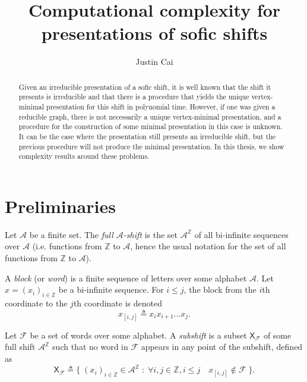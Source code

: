 \documentclass[hidelinks]{article}
\title{Computational complexity for presentations of sofic shifts}
\author{Justin Cai}
\newcommand{\Ac}{\mathcal{A}}  %
\newcommand{\Fc}{\mathcal{F}}
\newcommand{\shift}[1]{\mathsf{X}_{#1}}
\newcommand{\term}[1]{\textit{#1}}
\theoremstyle{definition}
\begin{document}
\maketitle

\begin{abstract}
    Given an irreducible presentation of a sofic shift, it is well known that the 
    shift it presents is irreducible and that there is a 
    procedure that yields the unique vertex-minimal presentation for
    this shift in polynomial time. However, if one was given a reducible 
    graph, there is not necessarily a unique vertex-minimal presentation, and 
    a procedure for the construction of some minimal presentation in 
    this case is unknown. It can be the case where the presentation still presents 
    an irreducible shift, but the previous procedure will not produce the 
    minimal presentation. In this thesis, we show complexity results around 
    these problems.
\end{abstract}


\section{Preliminaries}

\begin{definition}
    Let \(\Ac\) be a finite set. The \term{full \(\Ac\)-shift} is the set \(\Ac^\mathbb{Z}\) of all 
    bi-infinite sequences over \(\Ac\) (i.e. functions from \(\mathbb{Z}\) to \(\Ac\), hence the 
    usual notation for the set of all functions from \(\mathbb{Z}\) to \(\Ac\)).
\end{definition}

\noindent A \term{block} (or \term{word}) is a finite sequence of letters over some alphabet \(\Ac\). 
Let \(x=(x_i)_{i \in \mathbb{Z}}\) be a bi-infinite sequence. For \(i \leq j\), the block from the 
\(i\)th coordinate to the \(j\)th coordinate is denoted \[x_{[i,j]} \triangleq x_i x_{i+1} \dots x_{j}.\]

\begin{definition}
    Let \(\Fc\) be a set of words over some alphabet. A \term{subshift} is a subset \(\shift{\Fc}\)
    of some full shift \(\Ac^\mathbb{Z}\) such that no word in \(\Fc\) appears in any point of the subshift,
    defined as
    \[\shift{\Fc} \triangleq \Big\{ \; (x_i)_{i \in \mathbb{Z}} \in \Ac^\mathbb{Z} \; : \; \forall i, j \in \mathbb{Z}, i\leq j \quad  x_{[i,j]} \notin \Fc \; \Big\}.\]
\end{definition}
\end{document}
